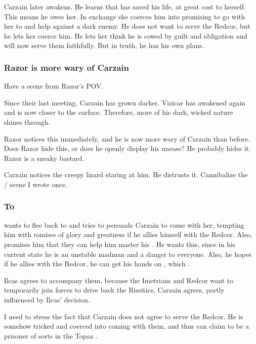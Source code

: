 Carzain later awakens.
He learns that \Esmerel has saved his life, at great cost to herself. 
This means he owes her.
In exchange she coerces him into promising to go with her to \Redce and help \ClanRedcor against a dark enemy. 
He does not want to serve the Redcor, but he lets her coerce him.
He lets her think he is cowed by guilt and obligation and will now serve them faithfully. 
But in truth, he has his own plans. 





\subsubsection{Razor is more wary of Carzain}
Have a scene from Razor's POV. 

Since their last meeting, Carzain has grown darker. 
Vizicar has awakened again and is now closer to the surface. 
Therefore, more of his dark, wicked \sathariah{} nature shines through. 

Razor notices this immediately, and he is now more wary of Carzain than before. 
Does Razor hide this, or does he openly display his unease? 
He probably hides it. 
Razor is a sneaky bastard. 

Carzain notices the creepy lizard staring at him. 
He distrusts it. 
Cannibalize the / scene I wrote once. 





\subsubsection{To \Redce}
\Esmerel{} wants to flee back to \Redce{} and tries to persuade Carzain to come with her, tempting him with romises of glory and greatness if he allies himself with the Redcor. 
Also, \Esmerel{} promises him that they can help him master his . 
He wants this, since in his current state he is an unstable madman and a danger to everyone. 
Also, he hopes if he allies with the Redcor, he can get his hands on , which . 

Ilcas agrees to accompany them, because the Imetrians and Redcor want to temporarily join forces to drive back the Rissitics. Carzain agrees, partly influenced by Ilcas' decision. 

I need to stress the fact that Carzain does not agree to serve the Redcor. He is somehow tricked and coerced into coming with them, and thus can claim to be a prisoner of sorts in the Topaz \Chateau. 

